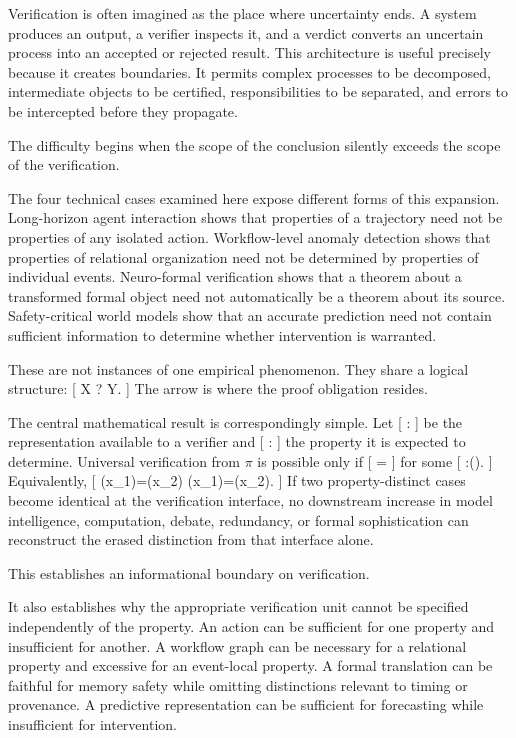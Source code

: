 \documentclass[11pt]{article}
\begin{document}
Verification is often imagined as the place where uncertainty ends. A system produces an output, a verifier inspects it, and a verdict converts an uncertain process into an accepted or rejected result. This architecture is useful precisely because it creates boundaries. It permits complex processes to be decomposed, intermediate objects to be certified, responsibilities to be separated, and errors to be intercepted before they propagate.

The difficulty begins when the scope of the conclusion silently exceeds the scope of the verification.

The four technical cases examined here expose different forms of this expansion. Long-horizon agent interaction shows that properties of a trajectory need not be properties of any isolated action. Workflow-level anomaly detection shows that properties of relational organization need not be determined by properties of individual events. Neuro-formal verification shows that a theorem about a transformed formal object need not automatically be a theorem about its source. Safety-critical world models show that an accurate prediction need not contain sufficient information to determine whether intervention is warranted.

These are not instances of one empirical phenomenon. They share a logical structure:
[
X
\quad\Longrightarrow?\quad
{}Y.
]
The arrow is where the proof obligation resides.

The central mathematical result is correspondingly simple. Let
[
\pi:\rightarrow{}
]
be the representation available to a verifier and
[
\Phi:\rightarrow{}
]
the property it is expected to determine. Universal verification from $\pi$ is possible only if
[
\Phi=\widehat{\Phi}\circ\pi
]
for some
[
\widehat{\Phi}:\Img(\pi)\rightarrow{}.
]
Equivalently,
[
\pi(x_1)=\pi(x_2)
\Longrightarrow
\Phi(x_1)=\Phi(x_2).
]
If two property-distinct cases become identical at the verification interface, no downstream increase in model intelligence, computation, debate, redundancy, or formal sophistication can reconstruct the erased distinction from that interface alone.

This establishes an informational boundary on verification.

It also establishes why the appropriate verification unit cannot be specified independently of the property. An action can be sufficient for one property and insufficient for another. A workflow graph can be necessary for a relational property and excessive for an event-local property. A formal translation can be faithful for memory safety while omitting distinctions relevant to timing or provenance. A predictive representation can be sufficient for forecasting while insufficient for intervention.
\end{document}
